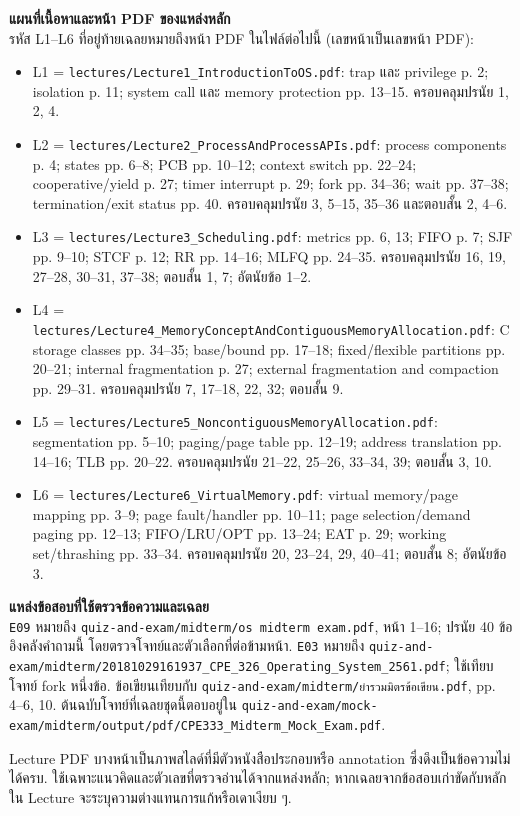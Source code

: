 \noindent\textbf{แผนที่เนื้อหาและหน้า PDF ของแหล่งหลัก}\\
รหัส L1--L6 ที่อยู่ท้ายเฉลยหมายถึงหน้า PDF ในไฟล์ต่อไปนี้ (เลขหน้าเป็นเลขหน้า PDF):
\begin{itemize}[leftmargin=1.4em,itemsep=.10cm]
\item L1 = \texttt{lectures/Lecture1\_IntroductionToOS.pdf}: trap และ privilege p. 2; isolation p. 11; system call และ memory protection pp. 13--15. ครอบคลุมปรนัย 1, 2, 4.
\item L2 = \texttt{lectures/Lecture2\_ProcessAndProcessAPIs.pdf}: process components p. 4; states pp. 6--8; PCB pp. 10--12; context switch pp. 22--24; cooperative/yield p. 27; timer interrupt p. 29; fork pp. 34--36; wait pp. 37--38; termination/exit status pp. 40. ครอบคลุมปรนัย 3, 5--15, 35--36 และตอบสั้น 2, 4--6.
\item L3 = \texttt{lectures/Lecture3\_Scheduling.pdf}: metrics pp. 6, 13; FIFO p. 7; SJF pp. 9--10; STCF p. 12; RR pp. 14--16; MLFQ pp. 24--35. ครอบคลุมปรนัย 16, 19, 27--28, 30--31, 37--38; ตอบสั้น 1, 7; อัตนัยข้อ 1--2.
\item L4 = \texttt{lectures/Lecture4\_MemoryConceptAndContiguousMemoryAllocation.pdf}: C storage classes pp. 34--35; base/bound pp. 17--18; fixed/flexible partitions pp. 20--21; internal fragmentation p. 27; external fragmentation and compaction pp. 29--31. ครอบคลุมปรนัย 7, 17--18, 22, 32; ตอบสั้น 9.
\item L5 = \texttt{lectures/Lecture5\_NoncontiguousMemoryAllocation.pdf}: segmentation pp. 5--10; paging/page table pp. 12--19; address translation pp. 14--16; TLB pp. 20--22. ครอบคลุมปรนัย 21--22, 25--26, 33--34, 39; ตอบสั้น 3, 10.
\item L6 = \texttt{lectures/Lecture6\_VirtualMemory.pdf}: virtual memory/page mapping pp. 3--9; page fault/handler pp. 10--11; page selection/demand paging pp. 12--13; FIFO/LRU/OPT pp. 13--24; EAT p. 29; working set/thrashing pp. 33--34. ครอบคลุมปรนัย 20, 23--24, 29, 40--41; ตอบสั้น 8; อัตนัยข้อ 3.
\end{itemize}
\noindent\textbf{แหล่งข้อสอบที่ใช้ตรวจข้อความและเฉลย}\\
\texttt{E09} หมายถึง \texttt{quiz-and-exam/midterm/os midterm exam.pdf}, หน้า 1--16; ปรนัย 40 ข้ออิงคลังคำถามนี้ โดยตรวจโจทย์และตัวเลือกที่ต่อข้ามหน้า. \texttt{E03} หมายถึง \texttt{quiz-and-exam/midterm/20181029161937\_CPE\_326\_Operating\_System\_2561.pdf}; ใช้เทียบโจทย์ fork หนึ่งข้อ. ข้อเขียนเทียบกับ \texttt{quiz-and-exam/midterm/ยำรวมมิตรข้อเขียน.pdf}, pp. 4--6, 10. ต้นฉบับโจทย์ที่เฉลยชุดนี้ตอบอยู่ใน \texttt{quiz-and-exam/mock-exam/midterm/output/pdf/CPE333\_Midterm\_Mock\_Exam.pdf}.\par
\noindent Lecture PDF บางหน้าเป็นภาพสไลด์ที่มีตัวหนังสือประกอบหรือ annotation ซึ่งดึงเป็นข้อความไม่ได้ครบ. ใช้เฉพาะแนวคิดและตัวเลขที่ตรวจอ่านได้จากแหล่งหลัก; หากเฉลยจากข้อสอบเก่าขัดกับหลักใน Lecture จะระบุความต่างแทนการแก้หรือเดาเงียบ ๆ.\par

